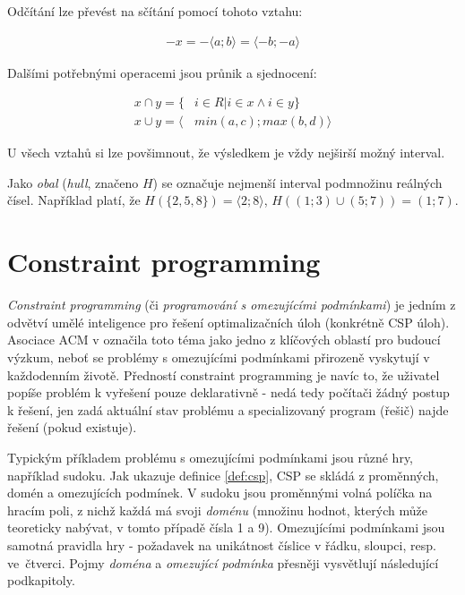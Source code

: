 Odčítání lze převést na sčítání pomocí tohoto vztahu:

\begin{subequations}
\begin{align}
   -x = - \langle a;b \rangle = \langle -b; -a \rangle
\end{align}
\end{subequations}


Dalšími potřebnými operacemi jsou průnik a sjednocení:

\begin{subequations}
\begin{align}
   x \cap y = \{ & i \in R | i \in x \wedge i \in y \} \\
   x \cup y = \langle & min(a, c); max(b, d) \rangle
\end{align}
\end{subequations}


U všech vztahů si lze povšimnout, že výsledkem je vždy nejširší možný interval.

Jako \emph{obal} (\emph{hull}, značeno $H$) se označuje nejmenší interval  podmnožinu reálných čísel. Například platí, že $H(\{2,5,8\}) = \langle 2; 8 \rangle$, $H((1;3) \cup (5;7)) = (1;7)$.




\section{Constraint programming}
\emph{Constraint programming} (či \emph{programování s omezujícími podmínkami}) je jedním z odvětví umělé inteligence pro řešení optimalizačních úloh (konkrétně CSP úloh). Asociace ACM v \cite{Wegner1996} označila toto téma jako jedno z klíčových oblastí pro budoucí výzkum, neboť se problémy s omezujícími podmínkami přirozeně vyskytují v každodenním životě. Předností constraint programming je navíc to, že uživatel popíše problém k vyřešení pouze deklarativně - nedá tedy počítači žádný postup k řešení, jen zadá aktuální stav problému a specializovaný program (řešič) najde řešení (pokud existuje).

Typickým příkladem problému s omezujícími podmínkami jsou různé hry, například sudoku. Jak ukazuje definice \ref{def:csp}, CSP se skládá z proměnných, domén a omezujících podmínek. V sudoku jsou proměnnými volná políčka na hracím poli, z nichž každá má svoji \emph{doménu} (množinu hodnot, kterých může teoreticky nabývat, v tomto případě čísla 1 a 9). Omezujícími podmínkami jsou samotná pravidla hry - požadavek na unikátnost číslice v řádku, sloupci, resp. ve~čtverci. Pojmy \emph{doména} a \emph{omezující podmínka} přesněji vysvětlují následující podkapitoly.

